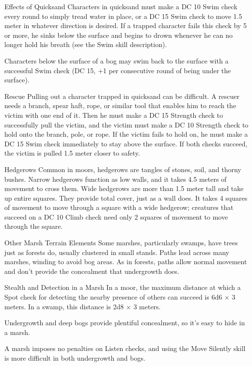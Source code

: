 Effects of Quicksand
Characters in quicksand must make a DC 10 Swim check every round to simply tread water in place, or a DC 15 Swim check to move 1.5 meter in whatever direction is desired. If a trapped character fails this check by 5 or more, he sinks below the surface and begins to drown whenever he can no longer hold his breath (see the Swim skill description).

Characters below the surface of a bog may swim back to the surface with a successful Swim check (DC 15, +1 per consecutive round of being under the surface).

Rescue
Pulling out a character trapped in quicksand can be difficult. A rescuer needs a branch, spear haft, rope, or similar tool that enables him to reach the victim with one end of it. Then he must make a DC 15 Strength check to successfully pull the victim, and the victim must make a DC 10 Strength check to hold onto the branch, pole, or rope. If the victim fails to hold on, he must make a DC 15 Swim check immediately to stay above the surface. If both checks succeed, the victim is pulled 1.5 meter closer to safety.

Hedgerows
Common in moors, hedgerows are tangles of stones, soil, and thorny bushes. Narrow hedgerows function as low walls, and it takes 4.5 meters of movement to cross them. Wide hedgerows are more than 1.5 meter tall and take up entire squares. They provide total cover, just as a wall does. It takes 4 squares of movement to move through a square with a wide hedgerow; creatures that succeed on a DC 10 Climb check need only 2 squares of movement to move through the square.

Other Marsh Terrain Elements
Some marshes, particularly swamps, have trees just as forests do, usually clustered in small stands. Paths lead across many marshes, winding to avoid bog areas. As in forests, paths allow normal movement and don’t provide the concealment that undergrowth does.

Stealth and Detection in a Marsh
In a moor, the maximum distance at which a Spot check for detecting the nearby presence of others can succeed is 6d6 $\times$ 3 meters. In a swamp, this distance is 2d8 $\times$ 3 meters.

Undergrowth and deep bogs provide plentiful concealment, so it’s easy to hide in a marsh.

A marsh imposes no penalties on Listen checks, and using the Move Silently skill is more difficult in both undergrowth and bogs.